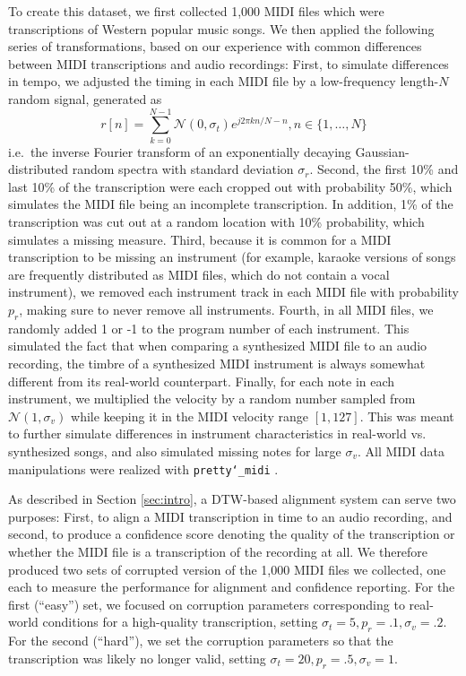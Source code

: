\documentclass{article}
\begin{document}
To create this dataset, we first collected 1,000 MIDI files which were transcriptions of Western popular music songs.
We then applied the following series of transformations, based on our experience with common differences between MIDI transcriptions and audio recordings: 
First, to simulate differences in tempo, we adjusted the timing in each MIDI file by a low-frequency length-$N$ random signal, generated as
$$
r[n] = \sum_{k = 0}^{N - 1} \mathcal{N}(0, \sigma_t) e^{j2\pi kn/N - n}, n \in \{1, \ldots, N\}
$$
i.e.\ the inverse Fourier transform of an exponentially decaying Gaussian-distributed random spectra with standard deviation $\sigma_r$.
Second, the first 10\% and last 10\% of the transcription were each cropped out with probability 50\%, which simulates the MIDI file being an incomplete transcription.
In addition, 1\% of the transcription was cut out at a random location with 10\% probability, which simulates a missing measure.
Third, because it is common for a MIDI transcription to be missing an instrument (for example, karaoke versions of songs are frequently distributed as MIDI files, which do not contain a vocal instrument), we removed each instrument track in each MIDI file with probability $p_r$, making sure to never remove all instruments.
Fourth, in all MIDI files, we randomly added 1 or -1 to the program number of each instrument.
This simulated the fact that when comparing a synthesized MIDI file to an audio recording, the timbre of a synthesized MIDI instrument is always somewhat different from its real-world counterpart.
Finally, for each note in each instrument, we multiplied the velocity by a random number sampled from $\mathcal{N}(1, \sigma_v)$ while keeping it in the MIDI velocity range $[1, 127]$.
This was meant to further simulate differences in instrument characteristics in real-world vs. synthesized songs, and also simulated missing notes for large $\sigma_v$.
All MIDI data manipulations were realized with \texttt{pretty\char`_midi} \cite{raffel2014pretty_midi}.

As described in Section \ref{sec:intro}, a DTW-based alignment system can serve two purposes: First, to align a MIDI transcription in time to an audio recording, and second, to produce a confidence score denoting the quality of the transcription or whether the MIDI file is a transcription of the recording at all.
We therefore produced two sets of corrupted version of the 1,000 MIDI files we collected, one each to measure the performance for alignment and confidence reporting.
For the first (``easy'') set, we focused on corruption parameters corresponding to real-world conditions for a high-quality transcription, setting $\sigma_t = 5, p_r = .1, \sigma_v = .2$.
For the second (``hard''), we set the corruption parameters so that the transcription was likely no longer valid, setting $\sigma_t = 20, p_r = .5, \sigma_v = 1$.
\end{document}
